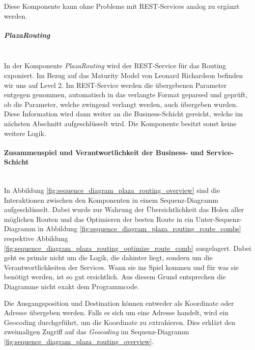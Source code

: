 Diese Komponente kann ohne Probleme mit \ac{REST}-Services analog zu  ergänzt werden.

\subparagraph{PlazaRouting}\label{impl:PlazaRouting}~\\
In der Komponente \emph{PlazaRouting} wird der \ac{REST}-Service für das Routing exponiert. Im Bezug auf das Maturity Model \cite{maturity_model} von Leonard Richardson befinden wir uns auf Level 2. Im \ac{REST}-Service werden die übergebenen Parameter entgegen genommen, automatisch in das verlangte Format geparsed und geprüft, ob die Parameter, welche zwingend verlangt werden, auch übergeben wurden. Diese Information wird dann weiter an die Business-Schicht gereicht, welche im nächsten Abschnitt aufgeschlüsselt wird. Die Komponente besitzt sonst keine weitere Logik.

\paragraph{Zusammenspiel und Verantwortlichkeit der Business- und Service-Schicht}\label{impl:Plaza Routing Zusammenspielund Verantwortlichkeit der Business- und Service-Schicht}~\\
In Abbildung \ref{fig:sequence_diagram_plaza_routing_overview} sind die Interaktionen zwischen den Komponenten in einem Sequenz-Diagramm aufgeschlüsselt. Dabei wurde zur Wahrung der Übersichtlichkeit das Holen aller möglichen Routen und das Optimieren der besten Route in ein Unter-Sequenz-Diagramm in Abbildung \ref{fig:sequence_diagram_plaza_routing_route_combs} respektive Abbildung \ref{fig:sequence_diagram_plaza_routing_optimize_route_comb} ausgelagert. Dabei geht es primär nicht um die Logik, die dahinter liegt, sondern um die Verantwortlichkeiten der Services. Wann sie ins Spiel kommen und für was sie benötigt werden, ist so gut ersichtlich. Aus diesem Grund entsprechen die Diagramme nicht exakt dem Programmcode. 

Die Ausgangsposition und Destination können entweder als Koordinate oder Adresse übergeben werden. Falls es sich um eine Adresse handelt, wird ein Geocoding durchgeführt, um die Koordinate zu extrahieren. Dies erklärt den zweimaligen Zugriff auf das \emph{Geocoding} im Sequenz-Diagramm \ref{fig:sequence_diagram_plaza_routing_overview}.

